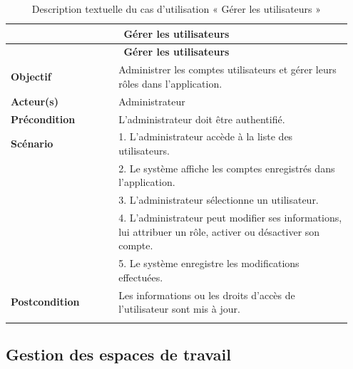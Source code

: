 \begin{longtable}[c]{|p{0.3\linewidth}|p{0.65\linewidth}|}
  \hline
  \multicolumn{2}{|c|}{\textbf{Gérer les utilisateurs}}                                                                                 \\
  \hline
  \endfirsthead

  \hline
  \multicolumn{2}{|c|}{\textbf{Gérer les utilisateurs}}                                                                                 \\
  \hline
  \endhead

  \hline
  \endfoot

  \hline
  \endlastfoot

  \textbf{Objectif}      & Administrer les comptes utilisateurs et gérer leurs rôles dans l'application.                                \\
  \hline
  \textbf{Acteur(s)}     & Administrateur                                                                                               \\
  \hline
  \textbf{Précondition}  & L'administrateur doit être authentifié.                                                                      \\
  \hline
  \textbf{Scénario}      &
  1. L'administrateur accède à la liste des utilisateurs.                                                                               \\
                         & 2. Le système affiche les comptes enregistrés dans l'application.                                            \\
                         & 3. L'administrateur sélectionne un utilisateur.                                                              \\
                         & 4. L'administrateur peut modifier ses informations, lui attribuer un rôle, activer ou désactiver son compte. \\
                         & 5. Le système enregistre les modifications effectuées.                                                       \\
  \hline
  \textbf{Postcondition} & Les informations ou les droits d'accès de l'utilisateur sont mis à jour.                                     \\
  \hline
  \caption{\centering Description textuelle du cas d'utilisation « Gérer les utilisateurs »}
\end{longtable}
\subsection{Gestion des espaces de travail}

